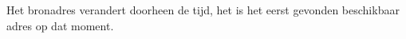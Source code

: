 Het bronadres verandert doorheen de tijd, het is het eerst gevonden beschikbaar adres op dat moment.